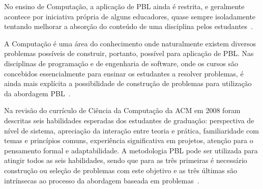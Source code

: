No ensino de Computação, a aplicação de PBL ainda é restrita, e geralmente
acontece por iniciativa própria de alguns educadores,
quase sempre isoladamente tentando melhorar a
absorção do conteúdo de uma disciplina
pelos estudantes~\cite{wood2003problem, o2012practical}.

A Computação é uma área do conhecimento onde naturalmente existem
diversos problemas possíveis de construir, portanto, possível para
aplicação de PBL.
Nas disciplinas de programação e de engenharia de software, onde os
cursos são concebidos essencialmente para ensinar os estudantes
a resolver problemas, é ainda mais explícita a possibilidade
de construção de problemas para utilização da abordagem
PBL~\cite{fee2010teaching}.

Na revisão do currículo de Ciência da Computação da ACM em 2008
foram descritas seis habilidades esperadas dos estudantes
de graduação: perspectiva de nível de sistema,
apreciação da interação entre teoria e prática,
familiaridade com temas e princípios comuns,
experiência significativa em projetos,
atenção para o pensamento formal e
adaptabilidade.
A metodologia PBL pode ser utilizada para atingir
todos as seis habilidades, sendo que para as três primeiras
é necessário construção ou seleção de problemas com este objetivo e 
as três últimas são intrínsecas ao processo da abordagem baseada
em problemas~\cite{cassel2008computer}.
